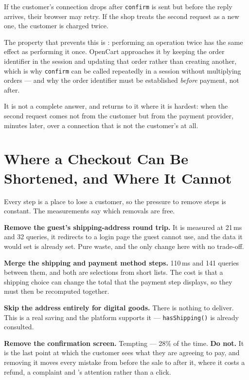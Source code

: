 \begin{alertbox}
If the customer's connection drops after \texttt{confirm} is sent but before
the reply arrives, their browser may retry. If the shop treats the second
request as a new one, the customer is charged twice.

\smallskip
The property that prevents this is : performing an operation
twice has the same effect as performing it once. OpenCart approaches it by
keeping the order identifier in the session and updating that order rather than
creating another, which is why \texttt{confirm} can be called repeatedly in a
session without multiplying orders --- and why the order identifier must be
established \emph{before} payment, not after.

\smallskip
It is not a complete answer, and  returns to it where it is
hardest: when the second request comes not from the customer but from the
payment provider, minutes later, over a connection that is not the customer's
at all.
\end{alertbox}

\section{Where a Checkout Can Be Shortened, and Where It Cannot}

Every step is a place to lose a customer, so the pressure to remove steps is
constant. The measurements say which removals are free.

\begin{conceptbox}
\begin{tightnum}
  \item \textbf{Remove the guest's shipping-address round trip.} It is measured
        at 21\,ms and 32 queries, it redirects to a login page the guest cannot
        use, and the data it would set is already set. Pure waste, and the only
        change here with no trade-off.
  \item \textbf{Merge the shipping and payment method steps.} 110\,ms and 141
        queries between them, and both are selections from short lists. The
        cost is that a shipping choice can change the total that the payment
        step displays, so they must then be recomputed together.
  \item \textbf{Skip the address entirely for digital goods.} There is nothing
        to deliver. This is a real saving and the platform supports it ---
        \texttt{hasShipping()} is already consulted.
  \item \textbf{Remove the confirmation screen.} Tempting --- 28\% of the time.
        \textbf{Do not.} It is the last point at which the customer sees what
        they are agreeing to pay, and removing it moves every mistake from
        before the sale to after it, where it costs a refund, a complaint and
        's attention rather than a click.
\end{tightnum}
\end{conceptbox}

